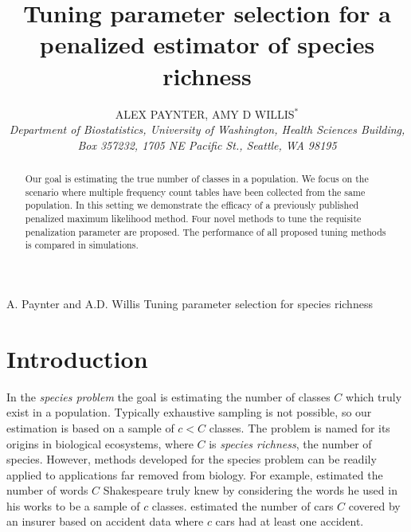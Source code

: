 \documentclass[oupdraft]{bio}
\begin{document}
\title{Tuning parameter selection for a penalized estimator of species richness}

\author{ALEX PAYNTER, AMY D WILLIS$^\ast$\\[4pt]
\textit{Department of Biostatistics,
University of Washington,
Health Sciences Building, Box 357232,
1705 NE Pacific St., Seattle, WA 98195}
}

\markboth%
{A. Paynter and A.D. Willis}
{Tuning parameter selection for species richness}

\maketitle


\begin{abstract}
{Our goal is estimating the true number of classes in a population.   We focus on the scenario where multiple frequency count tables have been collected from the same population.  In this setting we demonstrate the efficacy of a previously published penalized maximum likelihood method.  Four novel methods to tune the requisite penalization parameter are proposed.  The performance of all proposed tuning methods is compared in simulations.}
\end{abstract}


\section{Introduction}
\label{sec:introduction}

In the \textit{species problem} the goal is estimating the number of classes $C$ which truly exist in a population.  Typically exhaustive sampling is not possible, so our estimation is based on a sample of $c < C$ classes.  The problem is named for its origins in biological ecosystems, where $C$ is \textit{species richness}, the number of species.  However, methods developed for the species problem can be readily applied to applications far removed from biology.  For example, \citet{efron_1976} estimated the number of words $C$ Shakespeare truly knew by considering the words he used in his works to be a sample of $c$ classes.  \citet{fegatelli_2018} estimated the number of cars $C$ covered by an insurer based on accident data where $c$ cars had at least one accident.
\end{document}
